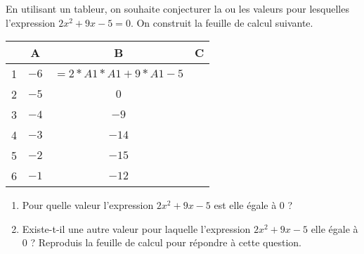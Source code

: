 
En utilisant un tableur, on souhaite conjecturer la ou les valeurs pour lesquelles l'expression $2x^2+9x-5=0$.
On construit la feuille de calcul suivante.

\begin{center}
 \begin{tabular}{|c|c|c|c|}
\hline 
 & A & B & C \\ 
\hline 
1 & $-6$ & $=2*A1*A1 + 9*A1 - 5$ & \\ 
\hline 
2 & $-5$  & $0$ &  \\ 
\hline 
3 &  $-4$ & $-9$ &  \\ 
\hline 
4 & $-3$  & $-14$ &  \\ 
\hline 
5 & $-2$  & $-15$ &  \\ 
\hline 
6 & $-1$  & $-12$ &  \\ 
\hline 
\end{tabular}
 \end{center} 

\begin{enumerate}
\item Pour quelle valeur l'expression $2x^2+9x-5$ est elle égale à 0 ?
\item Existe-t-il une autre valeur pour laquelle l'expression $2x^2+9x-5$ elle égale à 0 ? Reproduis la feuille de calcul pour répondre à cette question.
\end{enumerate}
